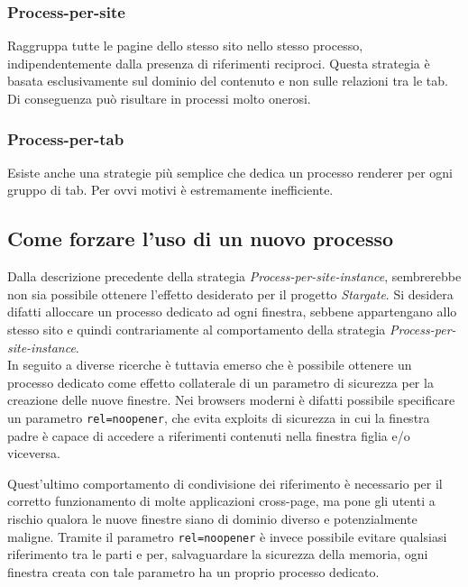 \subsubsection{Process-per-site}

Raggruppa tutte le pagine dello stesso sito nello stesso processo, indipendentemente dalla presenza di riferimenti reciproci. Questa strategia è basata esclusivamente sul dominio del contenuto e non sulle relazioni tra le tab. Di conseguenza può risultare in processi molto onerosi.

\subsubsection{Process-per-tab}

Esiste anche una strategie più semplice che dedica un processo renderer per ogni gruppo di tab. Per ovvi motivi è estremamente inefficiente.

\subsection{Come forzare l'uso di un nuovo processo}

Dalla descrizione precedente della strategia \textit{Process-per-site-instance}, sembrerebbe non sia possibile ottenere l'effetto desiderato per il progetto \textit{Stargate}. Si desidera difatti alloccare un processo dedicato ad ogni finestra, sebbene appartengano allo stesso sito e quindi contrariamente al comportamento della strategia \textit{Process-per-site-instance}. \\

In seguito a diverse ricerche è tuttavia emerso che è possibile ottenere un processo dedicato come effetto collaterale di un parametro di sicurezza per la creazione delle nuove finestre. Nei browsers moderni è difatti possibile specificare un parametro \texttt{rel=noopener}, che evita exploits di sicurezza in cui la finestra padre è capace di accedere a riferimenti contenuti nella finestra figlia e/o viceversa. 

Quest'ultimo comportamento di condivisione dei riferimento è necessario per il corretto funzionamento di molte applicazioni cross-page, ma pone gli utenti a rischio qualora le nuove finestre siano di dominio diverso e potenzialmente maligne. Tramite il parametro \texttt{rel=noopener} è invece possibile evitare qualsiasi riferimento tra le parti e per, salvaguardare la sicurezza della memoria, ogni finestra creata con tale parametro ha un proprio processo dedicato. \\

